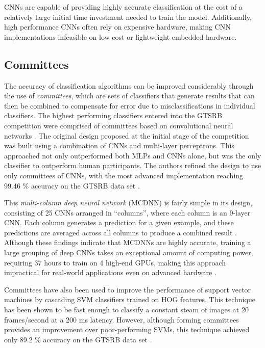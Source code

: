 \documentclass[letterpaper,twocolumn,10pt]{article}
\begin{document}
CNNs are capable of providing highly accurate classification at the cost of a relatively large initial time investment needed to train the model. Additionally, high performance CNNs often rely on expensive hardware, making CNN implementations infeasible on low cost or lightweight embedded hardware.

\subsection{Committees}

The accuracy of classification algorithms can be improved considerably through the use of \emph{committees}, which are sets of classifiers that generate results that can then be combined to compensate for error due to misclassifications in individual classifiers. The highest performing classifiers entered into the GTSRB competition were comprised of committees based on convolutional neural networks \cite{ciresan_committee_2011, ciresan_multi-column_2012, stallkamp_german_2011, stallkamp_man_2012}. The original design proposed at the initial stage of the competition was built using a combination of CNNs and multi-layer perceptrons. This approached not only outperformed both MLPs and CNNs alone, but was the only classifier to outperform human participants. The authors refined the design to use only committees of CNNs, with the most advanced implementation reaching 99.46 \% accuracy on the GTSRB data set \cite{ciresan_committee_2011, ciresan_multi-column_2012}.

This \emph{multi-column deep neural network} (MCDNN) is fairly simple in its design, consisting of 25 CNNs arranged in ``columns'', where each column is an 9-layer CNN. Each column generates a prediction for a given example, and these predictions are averaged across all columns to produce a combined result \cite{ciresan_multi-column_2012}. Although these findings indicate that MCDNNs are highly accurate, training a large grouping of deep CNNs takes an exceptional amount of computing power, requiring 37 hours to train on 4 high-end GPUs, making this approach impractical for real-world applications even on advanced hardware \cite{ciresan_multi-column_2012}.

Committees have also been used to improve the performance of support vector machines by cascading SVM classifiers trained on HOG features. This technique has been shown to be fast enough to classify a constant steam of images at 20 frames/second at a 200 ms latency. However, although forming committees provides an improvement over poor-performing SVMs, this technique achieved only 89.2 \% accuracy on the GTSRB data set \cite{greenhalgh_real-time_2012}.
\end{document}
